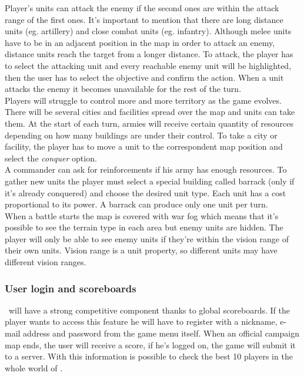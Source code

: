 
Player's units can attack the enemy if the second ones are within the attack
range of the first ones. It's important to mention that there are long
distance units (eg. artillery) and close combat units (eg. infantry). Although
melee units have to be in an adjacent position in the map in order to attack an
enemy, distance units reach the target from a longer distance. To attack, the
player has to select the attacking unit and every reachable enemy unit will be
highlighted, then the user has to select the objective and confirm the action.
When a unit attacks the enemy it becomes unavailable for the rest of the turn.\\


Players will struggle to control more and more territory as the game evolves.
There will be several cities and facilities spread over the map and units can
take them. At the start of each turn, armies will receive certain quantity of
resources depending on how many buildings are under their control. To take a
city or facility, the player has to move a unit to the correspondent map
position and select the \emph{conquer} option.\\


A commander can ask for reinforcements if his army has enough resources. To
gather new units the player must select a special building called barrack
(only if it's already conquered) and choose the desired unit type. Each unit
has a cost proportional to its power. A barrack can produce only one unit per
turn.\\


When a battle starts the map is covered with war fog which means that it's
possible to see the terrain type in each area but enemy units are hidden. The
player will only be able to see enemy units if they're within the vision range
of their own units. Vision range is a unit property, so different units may
have different vision ranges.\\


\subsubsection{User login and scoreboards}

\game\ will have a strong competitive component thanks to global scoreboards.
If the player wants to access this feature he will have to register with a
nickname, e-mail address and password from the game menu itself. When an
official campaign map ends, the user will receive a score, if he's logged on, the
game will submit it to a server. With this information is possible to check the
best 10 players in the whole world of \game.\\

